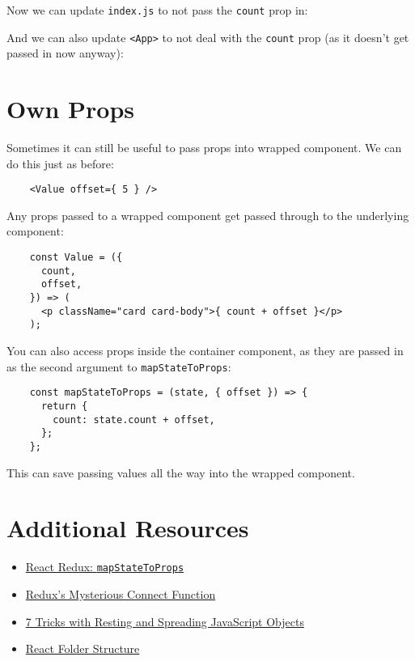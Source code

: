 Now we can update \texttt{index.js} to not pass the \texttt{count} prop in:


And we can also update \texttt{<App>} to not deal with the \texttt{count} prop (as it doesn't get passed in now anyway):



\section{Own Props}

Sometimes it can still be useful to pass props into wrapped component. We can do this just as before:

\begin{verbatim}
    <Value offset={ 5 } />
\end{verbatim}

Any props passed to a wrapped component get passed through to the underlying component:

\begin{verbatim}
    const Value = ({
      count,
      offset,
    }) => (
      <p className="card card-body">{ count + offset }</p>
    );
\end{verbatim}

You can also access props inside the container component, as they are passed in as the second argument to \texttt{mapStateToProps}:

\begin{verbatim}
    const mapStateToProps = (state, { offset }) => {
      return {
        count: state.count + offset,
      };
    };
\end{verbatim}

This can save passing values all the way into the wrapped component.


\section{Additional Resources}

\begin{itemize}[leftmargin=*]
    \item \href{https://react-redux.js.org/using-react-redux/connect-mapstate}{React Redux: \texttt{mapStateToProps}}
    \item \href{https://medium.com/mofed/reduxs-mysterious-connect-function-526efe1122e4}{Redux’s Mysterious Connect Function}
    \item \href{https://blog.bitsrc.io/6-tricks-with-resting-and-spreading-javascript-objects-68d585bdc83}{7 Tricks with Resting and Spreading JavaScript Objects}
    \item \href{https://www.robinwieruch.de/react-folder-structure}{React Folder Structure}
\end{itemize}

